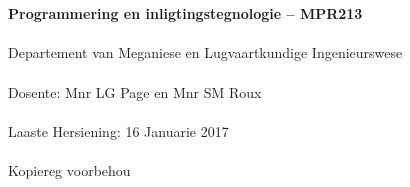 \begin{titlepage}
    \thispagestyle{empty}
    \\~\\[18cm]
    \large
    \textbf{Programmering en inligtingstegnologie -- MPR213} \\~\\
    Departement van Meganiese en Lugvaartkundige Ingenieurswese \\~\\[0.5cm]
    \normalsize
    Dosente: Mnr LG Page en  Mnr SM Roux \\~\\
    Laaste Hersiening: 16 Januarie 2017 \\~\\[0.5em]
    \textcopyright \quad Kopiereg voorbehou \\~\\
\end{titlepage}
\restoregeometry
